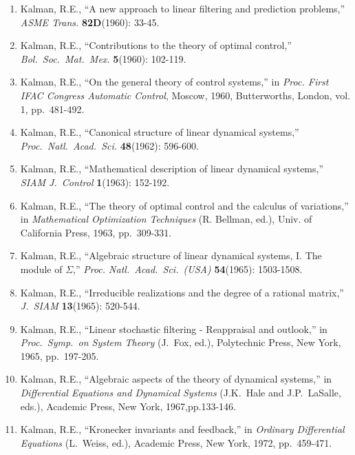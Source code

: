 \begin{enumerate}
\item
Kalman, R.E., ``A new approach to linear filtering and prediction problems,''
{\it ASME Trans.} {\bf 82D}(1960): 33-45.

\item
Kalman, R.E., ``Contributions to the theory of optimal control,'' {\it
Bol.~Soc.~Mat.~Mex.} {\bf 5}(1960): 102-119.

\item
Kalman, R.E., ``On the general theory of control systems,'' in {\it Proc.
First IFAC Congress Automatic Control}, Moscow, 1960, Butterworths, London,
vol. 1, pp.\ 481-492.

\item
Kalman, R.E., ``Canonical structure of linear dynamical systems,'' {\it Proc.\
Natl.\ Acad.\ Sci.} {\bf 48}(1962): 596-600.

\item
Kalman, R.E., ``Mathematical description of linear dynamical systems,'' {\it
SIAM J.\ Control} {\bf 1}(1963): 152-192.

\item
Kalman, R.E., ``The theory of optimal control and the calculus of
variations,'' in {\it Mathematical Optimization Techniques} (R. Bellman, ed.),
Univ. of California Press, 1963, pp.\ 309-331.

\item
Kalman, R.E., ``Algebraic structure of linear dynamical systems, I.  The
module of $\Sigma$,'' {\it Proc. Natl.\ Acad.\ Sci.\ (USA)} {\bf 54}(1965):
1503-1508.

\item
Kalman, R.E., ``Irreducible realizations and the degree of a rational
matrix,'' {\it J.\ SIAM} {\bf 13}(1965): 520-544.

\item
Kalman, R.E., ``Linear stochastic filtering - Reappraisal and outlook,'' in
{\it Proc.\ Symp.\ on System Theory} (J.\ Fox, ed.), Polytechnic Press, New
York, 1965, pp.\ 197-205.

\item
Kalman, R.E., ``Algebraic aspects of the theory of dynamical systems,'' in
{\it Differential Equations and Dynamical Systems} (J.K.\ Hale and J.P.\
LaSalle, eds.), Academic Press, New York, 1967,pp.133-146.

\item
Kalman, R.E., ``Kronecker invariants and feedback,'' in {\it Ordinary
Differential Equations} (L.\ Weiss, ed.), Academic Press, New York, 1972, pp.\
459-471.


\end{enumerate}
